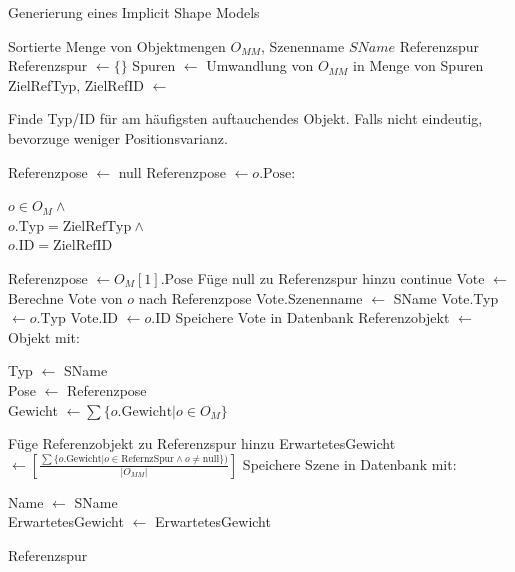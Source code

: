 \begin{algorithm}
  \caption{Generierung eines Implicit Shape Models}
  \small
  \label{algo:ism-generierung}
  \begin{algorithmic}[1]
    \Require Sortierte Menge von Objektmengen $O_{MM}$, Szenenname $SName$\;
    \Ensure Referenzspur\;
    \State Referenzspur $\gets \{\}$\;
    \State Spuren $\gets$ Umwandlung von $O_{MM}$ in Menge von Spuren\;
    \State ZielRefTyp, ZielRefID $\gets$ \parbox[t]{\dimexpr\linewidth-140pt\relax}{
      Finde Typ/ID für am häufigsten auftauchendes Objekt. Falls nicht eindeutig, bevorzuge weniger Positionsvarianz.}\strut\;
      \State Referenzpose $\gets$ null\;
        \State Referenzpose $\gets o.\text{Pose} :$ \parbox[t]{\dimexpr\linewidth-140pt\relax}{$o \in O_M \wedge $\\
            $o.\text{Typ} = \text{ZielRefTyp} \wedge$\\
            $o.\text{ID} = \text{ZielRefID}$}\strut\;
        \State Referenzpose $\gets O_M[1].\text{Pose}$\;
      \Else
        \State Füge null zu Referenzspur hinzu\;
        \State continue\;
      \EndIf
        \State Vote $\gets$ Berechne Vote von $o$ nach Referenzpose\;
        \State Vote.Szenenname $\gets$ SName\;
        \State Vote.Typ $\gets o.\text{Typ}$\;
        \State Vote.ID $\gets o.\text{ID}$\;
        \State Speichere Vote in Datenbank\;
      \EndFor
      \State Referenzobjekt $\gets$ Objekt mit: \parbox[t]{\dimexpr\linewidth-\algorithmicindent-\algorithmicindent\relax}{
        Typ $\gets$ SName\\
        Pose $\gets$ Referenzpose\\
        Gewicht $\gets \sum \{o.\text{Gewicht} | o \in O_M\}$
      }\strut\;
      \State Füge Referenzobjekt zu Referenzspur hinzu\;
    \EndFor
    \State ErwartetesGewicht $\gets \left[ \frac{\sum \{o.\text{Gewicht} | o \in \text{RefernzSpur} \wedge o \neq \text{null}\})}{\left| O_{MM} \right|} \right]$
    \State Speichere Szene in Datenbank mit: \parbox[t]{\dimexpr\linewidth-\algorithmicindent\relax}{Name $\gets$ SName\\
    ErwartetesGewicht $\gets$ ErwartetesGewicht}\strut\;
    \State \Return Referenzspur\;
  \end{algorithmic}
\end{algorithm}

